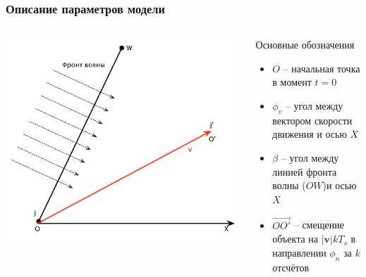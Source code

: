 \documentclass[utf8]{beamer}
\begin{document}
\begin{frame}
\frametitle{Описание параметров модели}
\begin{columns}
\begin{block}{}
\centering
\includegraphics[width=1.2\textwidth]{pics/movement.pdf}
\end{block}
\begin{block}{Основные обозначения}
\begin{itemize}
        \item $O$ -- начальная точка в момент $t=0$
        \item $\phi_v$ -- угол между вектором скорости движения и осью $X$
        \item $\beta$ -- угол между линией фронта волны ($OW$)и осью $X$
        \item $\overrightarrow{OO'}$ -- смещение объекта  на $|\boldsymbol{v}|kT_s$ в направлении $\phi_n$ за $k$ отсчётов
\end{itemize}
\end{block}
\end{columns}
\end{frame}
\end{document}
